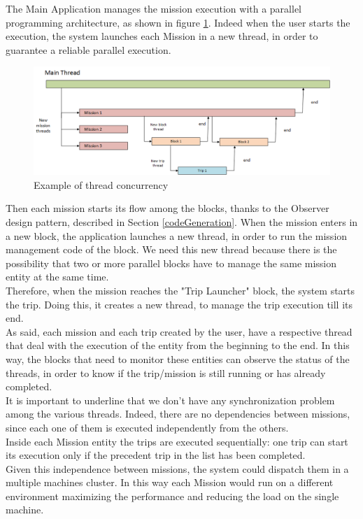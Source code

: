 The Main Application manages the mission execution with a parallel programming architecture, as shown in figure \ref{fig:threads}.
Indeed when the user starts the execution, the system launches each Mission in a new thread, in order to guarantee a reliable parallel execution.
\\

\begin{figure}[h!]
\includegraphics[width=\linewidth]
{pictures/threads.png}
\caption{Example of thread concurrency}
\label{fig:threads}
\end{figure}

Then each mission starts its flow among the blocks, thanks to the Observer design pattern, described in Section \ref{codeGeneration}.
When the mission enters in a new block, the application launches a new thread, in order to run the mission management code of the block.
We need this new thread because there is the possibility that two or more parallel blocks have to manage the same mission entity at the same time.
\\

Therefore, when the mission reaches the "Trip Launcher" block, the system starts the trip.
Doing this, it creates a new thread, to manage the trip execution till its end.
\\

As said, each mission and each trip created by the user, have a respective thread that deal with the execution of the entity from the beginning to the end. In this way, the blocks that need to monitor these entities can observe the status of the threads, in order to know if the trip/mission is still running or has already completed.
\\

It is important to underline that we don't have any synchronization problem among the various threads.
Indeed, there are no dependencies between missions, since each one of them is executed independently from the others.
\\
Inside each Mission entity the trips are executed sequentially:
one trip can start its execution only if the precedent trip in the list has been completed.
\\
Given this independence between missions, the system could dispatch them in a multiple machines cluster. In this way each Mission would run on a different environment maximizing the performance and reducing the load on the single machine.
\\

